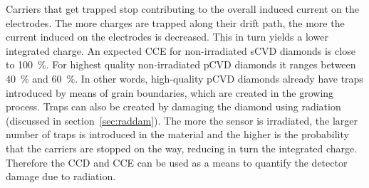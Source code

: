 Carriers that get trapped stop contributing to the overall induced current on the electrodes. The more charges are trapped along their drift path, the more the current induced on the electrodes is decreased. This in turn yields a lower integrated charge. 
An expected CCE for non-irradiated sCVD diamonds is close to 100~\%. For highest quality non-irradiated pCVD diamonds it ranges between 40~\% and 60~\%. In other words, high-quality pCVD diamonds already have traps introduced by means of grain boundaries, which are created in the growing process. Traps can also be created by damaging the diamond using radiation (discussed in section~\ref{sec:raddam}). The more the sensor is irradiated, the larger number of traps is introduced in the material and the higher is the probability that the carriers are stopped on the way, reducing in turn the integrated charge. Therefore the CCD and CCE can be used as a means to quantify the detector damage due to radiation.

